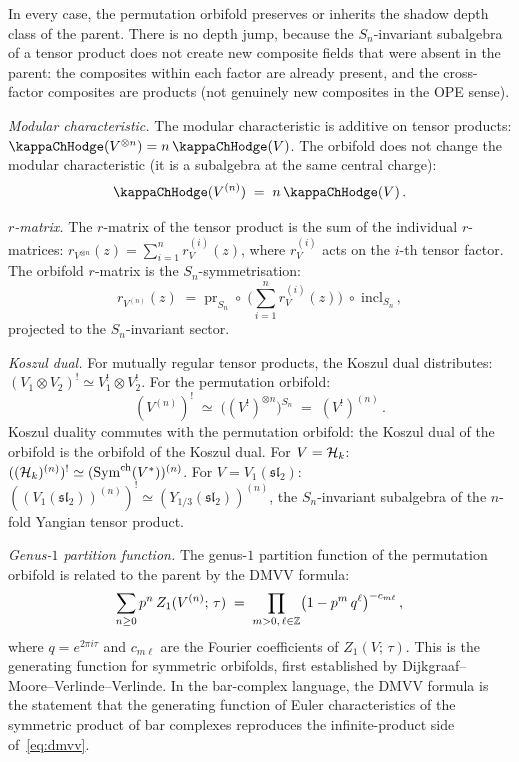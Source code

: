 \begin{computation}
In every case, the permutation orbifold preserves or
inherits the shadow depth class of the parent. There
is no depth jump, because the $S_n$-invariant subalgebra
of a tensor product does not create new composite fields
that were absent in the parent: the composites within each
factor are already present, and the cross-factor composites
are products (not genuinely new composites in the OPE
sense).

\smallskip
\noindent
\emph{Modular characteristic.}
The modular characteristic is additive on tensor products:
$\kappaChHodge(V^{\otimes n}) = n\,\kappaChHodge(V)$. The orbifold
does not change the modular characteristic
(it is a subalgebra at the same central charge):
\begin{equation}\label{eq:perm-kappa}
\kappaChHodge(V^{(n)}) \;=\; n\,\kappaChHodge(V)\,.
\end{equation}

\smallskip
\noindent
\emph{$r$-matrix.}
The $r$-matrix of the tensor product is the sum of the
individual $r$-matrices:
$r_{V^{\otimes n}}(z) = \sum_{i=1}^{n} r_V^{(i)}(z)$,
where $r_V^{(i)}$ acts on the $i$-th tensor factor.
The orbifold $r$-matrix is the $S_n$-symmetrisation:
\begin{equation}\label{eq:perm-r-matrix}
r_{V^{(n)}}(z)
\;=\;
\mathrm{pr}_{S_n}\;\circ\;
\biggl(\sum_{i=1}^{n} r_V^{(i)}(z)\biggr)
\;\circ\; \mathrm{incl}_{S_n}\,,
\end{equation}
projected to the $S_n$-invariant sector.

\smallskip
\noindent
\emph{Koszul dual.}
For mutually regular tensor products, the Koszul dual
distributes: $(V_1 \otimes V_2)^! \simeq V_1^! \otimes V_2^!$.
For the permutation orbifold:
\begin{equation}\label{eq:perm-koszul-dual}
(V^{(n)})^!
\;\simeq\;
\bigl((V^!)^{\otimes n}\bigr)^{S_n}
\;=\;
(V^!)^{(n)}\,.
\end{equation}
Koszul duality commutes with the permutation orbifold:
the Koszul dual of the orbifold is the orbifold of
the Koszul dual. For $V = \mathcal{H}_k$:
$((\mathcal{H}_k)^{(n)})^! \simeq
(\mathrm{Sym}^{\mathrm{ch}}(V^*))^{(n)}$.
For $V = V_1(\mathfrak{sl}_2)$:
$((V_1(\mathfrak{sl}_2))^{(n)})^! \simeq
(Y_{1/3}(\mathfrak{sl}_2))^{(n)}$, the $S_n$-invariant
subalgebra of the $n$-fold Yangian tensor product.

\smallskip
\noindent
\emph{Genus-$1$ partition function.}
The genus-$1$ partition function of the permutation orbifold
is related to the parent by the DMVV formula:
\begin{equation}\label{eq:dmvv}
\sum_{n \ge 0} p^n\, Z_1(V^{(n)};\, \tau)
\;=\;
\prod_{m > 0,\, \ell \in \mathbb{Z}}
\bigl(1 - p^m\, q^\ell\bigr)^{-c_{m\ell}}\,,
\end{equation}
where $q = e^{2\pi i\tau}$ and $c_{m\ell}$ are the
Fourier coefficients of $Z_1(V;\, \tau)$. This is the
generating function for symmetric orbifolds, first
established by Dijkgraaf--Moore--Verlinde--Verlinde.
In the bar-complex language, the DMVV formula is the
statement that the generating function of Euler
characteristics of the symmetric product of bar
complexes reproduces the infinite-product side
of~\eqref{eq:dmvv}.


\end{computation}
